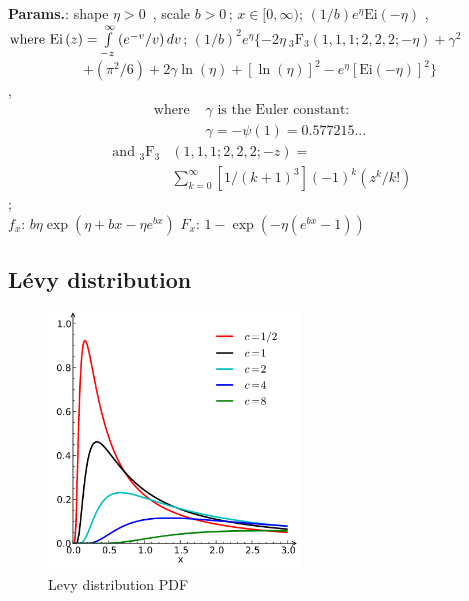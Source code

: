     {\color{darkblue} \textbf{Params.}:} {shape $\eta>0\,\!$ , scale $b > 0\,\!$}; {$x \in [0, \infty)\!$}; {$(1/b)e^{\eta}\text{Ei}\left(-\eta\right)$ ,  $ \text {where  Ei}\left(z\right)=\int\limits_{-z}^{\infty}\left(e^{-v}/v\right)dv$}; {$\left(1/b\right)^2 e^{\eta}\{-2\eta { \ }_3\text {F}_3 \left(1,1,1;2,2,2;-\eta\right)+\gamma^2$ $$+\left(\pi^2/6\right)+2\gamma\ln\left(\eta\right)+[\ln\left(\eta\right)]^2-e^{\eta}[\text{Ei}\left(-\eta \right)]^2\}$$ ,  \begin{align}\text{ where } &\gamma \text{ is the Euler constant: }\,\!\\ &\gamma=-\psi\left(1\right)=\text{0.577215... }\end{align} \begin{align}\text { and } { }_3\text {F}_3&\left(1,1,1;2,2,2;-z\right)=\\&\sum_{k=0}^\infty\left[1/\left(k+1\right)^3\right]\left(-1\right)^k\left(z^k/k!\right)\end{align}};\hspace{0.5cm}\\{\color{darkblue} \textbf{$f_x$}:} {$b\eta \exp\left(\eta + bx -\eta e^{bx} \right)$}{\color{darkblue} \textbf{$F_x$}:} {$1-\exp\left(-\eta\left(e^{bx}-1 \right)\right)$}



    
        
\subsection{Lévy distribution}


    \begin{figure}[H]
        \centering
        \includegraphics[width=0.6\textwidth]{images/Levy0 distributionPDF.png}
        \caption{Levy distribution PDF}
    \end{figure}




